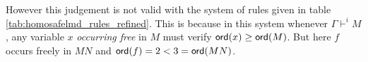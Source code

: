 However this judgement is not valid with the system of rules given in table \ref{tab:homosafelmd_rules_refined}. This is because
in this system whenever $\Gamma \vdash^i M$, any variable $x$ \emph{occurring free} in $M$ must verify ${\sf ord}(x)\geq{\sf ord}(M)$. But
here $f$ occurs freely in $M N$ and ${\sf ord}(f) = 2 < 3 = {\sf ord}(M N)$.
